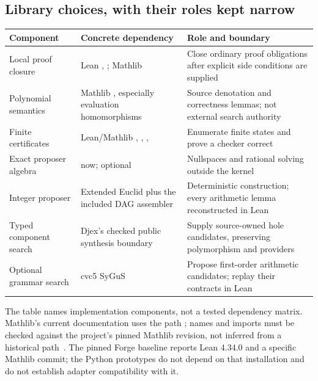 \subsection{Library choices, with their roles kept narrow}
\begin{center}
\small
\begin{tabularx}{\textwidth}{@{}p{}YY@{}}
\toprule
Component & Concrete dependency & Role and boundary \\
\midrule
Local proof closure & Lean , ; Mathlib  & Close ordinary proof obligations after explicit side conditions are supplied \\
Polynomial semantics & Mathlib , especially evaluation homomorphisms & Source denotation and correctness lemmas; not external search authority \\
Finite certificates & Lean/Mathlib , , ,  & Enumerate finite states and prove a checker correct \\
Exact proposer algebra &  now; optional  & Nullspaces and rational solving outside the kernel \\
Integer proposer & Extended Euclid plus the included DAG assembler & Deterministic construction; every arithmetic lemma reconstructed in Lean \\
Typed component search & Djex's checked public synthesis boundary & Supply source-owned hole candidates, preserving polymorphism and providers \\
Optional grammar search & cvc5 SyGuS & Propose first-order arithmetic candidates; replay their contracts in Lean \\
\bottomrule
\end{tabularx}
\end{center}

The table names implementation components, not a tested dependency matrix.
Mathlib's current documentation uses the path
; names and imports must be checked
against the project's pinned Mathlib revision, not inferred from a historical
 path~\cite{mvpoly}. The pinned Forge baseline reports
Lean 4.34.0 and a specific Mathlib commit; the Python prototypes do not depend on
that installation and do not establish adapter compatibility with it.

